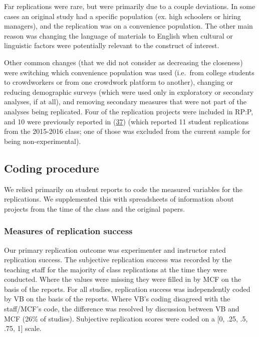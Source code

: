 \documentclass[
  english,
  a4paper,
]{article}
\begin{document}
Far replications were rare, but were primarily due to a couple deviations. In some cases an original study had a specific population (ex. high schoolers or hiring managers), and the replication was on a convenience population. The other main reason was changing the language of materials to English when cultural or linguistic factors were potentially relevant to the construct of interest.

Other common changes (that we did not consider as decreasing the closeness) were switching which convenience population was used (i.e.~from college students to crowdworkers or from one crowdwork platform to another), changing or reducing demographic surveys (which were used only in exploratory or secondary analyses, if at all), and removing secondary measures that were not part of the analyses being replicated.
Four of the replication projects were included in RP:P, and 10 were previously reported in (\protect\hyperlink{ref-hawkins2018}{37}) (which reported 11 student replications from the 2015-2016 class; one of those was excluded from the current sample for being non-experimental).

\hypertarget{coding-procedure}{%
\subsection{Coding procedure}\label{coding-procedure}}

We relied primarily on student reports to code the measured variables for the replications. We supplemented this with spreadsheets of information about projects from the time of the class and the original papers.

\hypertarget{measures-of-replication-success}{%
\subsubsection{Measures of replication success}\label{measures-of-replication-success}}

Our primary replication outcome was experimenter and instructor rated replication success. The subjective replication success was recorded by the teaching staff for the majority of class replications at the time they were conducted. Where the values were missing they were filled in by MCF on the basis of the reports. For all studies, replication success was independently coded by VB on the basis of the reports. Where VB's coding disagreed with the staff/MCF's code, the difference was resolved by discussion between VB and MCF (26\% of studies). Subjective replication scores were coded on a {[}0, .25, .5, .75, 1{]} scale.
\end{document}
